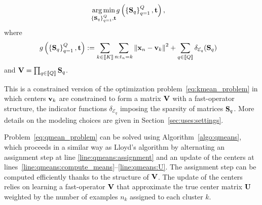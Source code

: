 \begin{align}
\label{eq:qmean_problem}
 \operatorname*{arg\,min}_{\left\{{\mathbf{S}}_q\right\}_{q=1}^{Q}, {\mathbf{t}}} & g\left(\left\{{\mathbf{S}}_q\right\}_{q=1}^{Q}, {\mathbf{t}}\right), 
 \end{align}
where
\small
\begin{align}
  g\left(\left\{{\mathbf{S}}_q\right\}_{q=1}^{Q}, {\mathbf{t}}\right) & := \sum_{k\in\left \llbracket K\right \rrbracket} \sum_{{n:t_n = k}} \left\|{\mathbf{x}}_n -{\mathbf{v}}_k\right\|^2 
  + \sum_{q\in\left \llbracket Q\right \rrbracket} \delta_{\mathcal{E}_q}({\mathbf{S}}_q)
 \label{eq:objective}
\end{align}
\normalsize
and ${\mathbf{V}} = \prod_{q\in\left \llbracket Q\right \rrbracket}{\mathbf{S}}_q$.

%
This is a constrained version of the \kmeans optimization problem~\eqref{eq:kmean_problem} in which centers ${\mathbf{v}}_k$ are constrained to form a matrix ${\mathbf{V}}$ with a fast-operator structure, the indicator functions $\delta_{\mathcal{E}_q}$ imposing the sparsity of matrices ${\mathbf{S}}_q$.
More details on the modeling choices are given in Section~\ref{sec:uses:settings}.

Problem~\eqref{eq:qmean_problem} can be solved using Algorithm~\ref{algo:qmeans},
which proceeds in a similar way as Lloyd's algorithm by alternating an assignment step at line \ref{line:qmeans:assignment} and an update of the centers at lines~\ref{line:qmeans:compute_means}--\ref{line:qmeans:U}. The assignment step can be computed efficiently thanks to the structure of ${\mathbf{V}}$. The update of the centers relies on learning a fast-operator ${\mathbf{V}}$ 
that approximate the true center matrix ${\mathbf{U}}$ weighted by the number of examples $n_k$ assigned to each cluster $k$.


